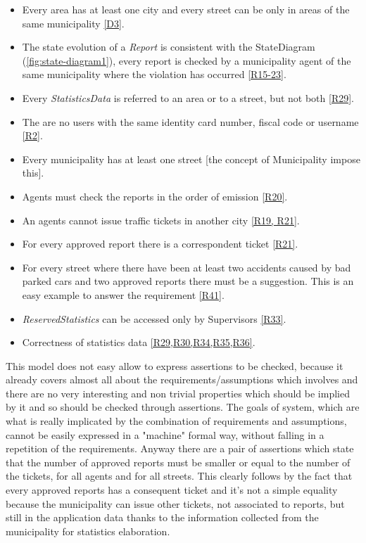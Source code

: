 \documentclass[a4paper]{report}
\begin{document}
\begin{itemize}
\item Every area has at least one city and every street can be only in areas of the same municipality \hyperref[D3]{[D3]}.
\item The state evolution of a \textit{Report} is consistent with the StateDiagram (\ref{fig:state-diagram1}), every report is checked by a municipality agent of the same municipality where the violation has occurred \hyperref[R15]{[R15-23]}.
\item Every \textit{StatisticsData} is referred to an area or to a street, but not both \hyperref[R29]{[R29]}.
\item The are no users with the same identity card number, fiscal code or username \hyperref[R2]{[R2]}.
\item Every municipality has at least one street [the concept of Municipality impose this].
\item Agents must check the reports in the order of emission \hyperref[R20]{[R20]}.
\item An agents cannot issue traffic tickets in another city \hyperref[R19]{[R19, R21]}.
\item For every approved report there is a correspondent ticket \hyperref[R21]{[R21]}.
\item For every street where there have been at least two accidents caused by bad parked cars and two approved reports there must be a suggestion. This is an easy example to answer the requirement \hyperref[R41]{[R41]}.
\item \textit{ReservedStatistics} can be accessed only by Supervisors \hyperref[R33]{[R33]}.
\item Correctness of statistics data \hyperref[R29]{[R29,R30,R34,R35,R36]}.
\end{itemize}
This model does not easy allow to express assertions to be checked, because it already covers almost all about the requirements/assumptions which involves and there are no very interesting and non trivial properties which should be implied by it and so should be checked through assertions. The goals of system, which are what is really implicated by the combination of requirements and assumptions, cannot be easily expressed in a "machine" formal way, without falling in a repetition of the requirements. Anyway there are a pair of assertions which state that the number of approved reports must be smaller or equal to the number of the tickets, for all agents and for all streets. This clearly follows by the fact that every approved reports has a consequent ticket and it's not a simple equality because the municipality can issue other tickets, not associated to reports, but still in the application data thanks to the information collected from the municipality for statistics elaboration.\\
\end{document}
